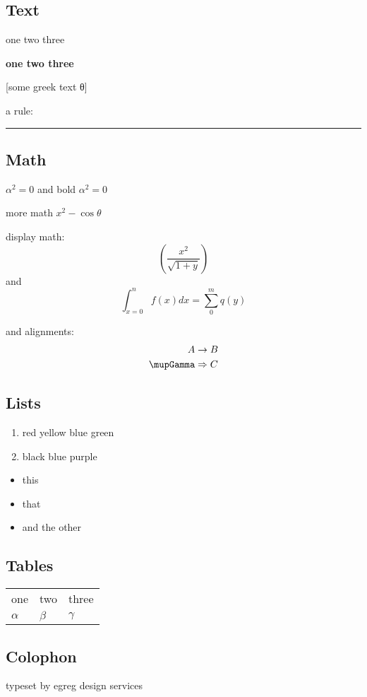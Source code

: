 \documentclass{article}
\begin{document}
\subsection{Text}

one two three

\textbf{one two three}

[some greek text θ]

a  rule: \rule{3cm}{1pt}

\subsection{Math}

$\alpha^2=0$ and bold {\boldmath $\alpha^2=0$}



more math $x^2-\cos θ$


display math:
\[\left(\frac{x^2}{\sqrt{1+y}}\right)\]
and
\[\int_{x=0}^n f(x) dx = \sum_0^m q(y)\]

and alignments:
\begin{align}
A &\rightarrow B\\
\mupGamma &\Rightarrow C
\end{align}


\subsection{Lists}

\begin{enumerate}
\item red yellow blue green
\item black blue purple
\end{enumerate}

\begin{itemize}
\item this
\item that
\item and the other
\end{itemize}


\subsection{Tables}



\begin{center}

\begin{tabular}{|l|l|l|}
\cline{1-3}
one & two & three\\
$\alpha$ & $\beta$ & $\gamma$\\
\cline{1-3}
\end{tabular}

\end{center}

\subsection{Colophon}
\raggedleft
typeset by egreg design services
\end{document}
